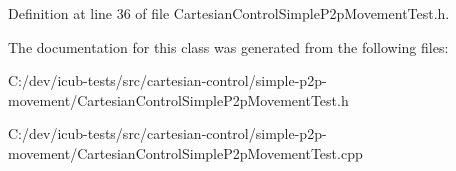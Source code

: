 Definition at line 36 of file Cartesian\+Control\+Simple\+P2p\+Movement\+Test.\+h.



The documentation for this class was generated from the following files\+:\begin{DoxyCompactItemize}
\item 
C\+:/dev/icub-\/tests/src/cartesian-\/control/simple-\/p2p-\/movement/Cartesian\+Control\+Simple\+P2p\+Movement\+Test.\+h\item 
C\+:/dev/icub-\/tests/src/cartesian-\/control/simple-\/p2p-\/movement/Cartesian\+Control\+Simple\+P2p\+Movement\+Test.\+cpp\end{DoxyCompactItemize}
